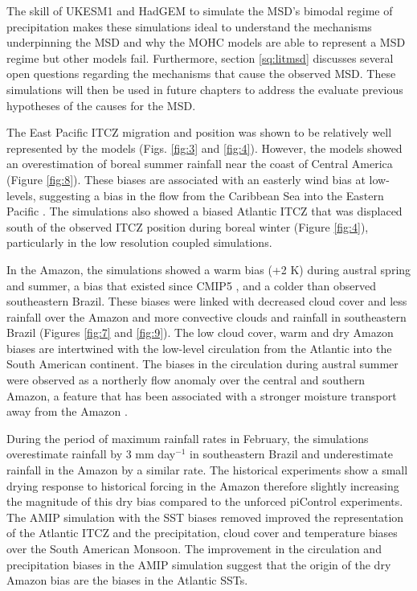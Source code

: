 The skill of UKESM1 and HadGEM to simulate the MSD's bimodal regime of precipitation makes these simulations ideal to understand the mechanisms underpinning the MSD and why the MOHC models are able to represent a MSD regime but other models fail. Furthermore, section \ref{sq:litmsd} discusses several open questions regarding the mechanisms that cause the observed MSD. These simulations will then be used in future chapters to address the evaluate previous hypotheses of the causes for the MSD. 


The East Pacific ITCZ migration and position was shown to be relatively well represented by the models (Figs. \ref{fig:3} and \ref{fig:4}). However, the models showed an overestimation of boreal summer rainfall near the coast of Central America (Figure \ref{fig:8}). These biases are associated with an easterly wind bias at low-levels, suggesting a bias in the flow from the Caribbean Sea into the Eastern Pacific  \citep{herrera2015,duranquesada2017}. 
The simulations also showed a biased Atlantic ITCZ that was displaced south of the observed ITCZ position during boreal winter (Figure \ref{fig:4}), particularly in the low resolution coupled simulations. 

In the Amazon, the simulations showed a warm bias (+2 K) during austral spring and summer, a bias that existed since CMIP5 \citep{jones2013}, and a colder than observed southeastern Brazil.
 These biases were linked with decreased cloud cover and less rainfall over the Amazon and more convective clouds and rainfall in southeastern Brazil (Figures \ref{fig:7} and \ref{fig:9}). 
The low cloud cover, warm and dry Amazon biases are intertwined with the low-level circulation from the Atlantic into the South American continent. The biases in the circulation during austral summer were observed as a northerly flow anomaly over the central and southern Amazon, a feature that has been associated with a stronger moisture transport away from the Amazon \citep{marengo2012,jones2017}. %


During the period of maximum rainfall rates in February, the simulations overestimate rainfall by 3 mm day$^{-1}$ in southeastern Brazil and underestimate rainfall in the Amazon by a similar rate. The historical experiments show a small drying response to historical forcing in the Amazon therefore slightly increasing the magnitude of this dry bias compared to the unforced piControl experiments.
The AMIP simulation with the SST biases removed improved the representation of the Atlantic ITCZ and the precipitation, cloud cover and temperature biases over the South American Monsoon.   The improvement in the circulation and precipitation biases in the AMIP simulation suggest that the origin of the dry Amazon bias are the biases in the Atlantic SSTs. 

